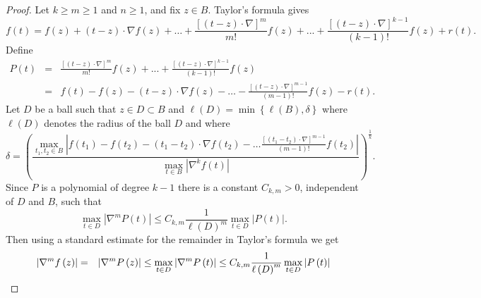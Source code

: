 \documentclass{amsart}
\theoremstyle{plain}
\numberwithin{equation}{section}
\begin{document}
\begin{proof}
Let $k\geq m\geq 1$ and $n\geq 1$, and fix $z\in B$. Taylor's formula gives%
\begin{equation*}
f\left( t\right) =f\left( z\right) +\left( t-z\right) \cdot \nabla f\left(
z\right) +\dots +\frac{\left[ \left( t-z\right) \cdot \nabla \right] ^{m}}{m!%
}f\left( z\right) +...+\frac{\left[ \left( t-z\right) \cdot \nabla \right]
^{k-1}}{\left( k-1\right) !}f\left( z\right) +r\left( t\right) .
\end{equation*}%
Define 
\begin{eqnarray*}
P\left( t\right) &=&\frac{\left[ \left( t-z\right) \cdot \nabla \right] ^{m}%
}{m!}f\left( z\right) +...+\frac{\left[ \left( t-z\right) \cdot \nabla %
\right] ^{k-1}}{\left( k-1\right) !}f\left( z\right) \\
&=&f\left( t\right) -f\left( z\right) -\left( t-z\right) \cdot \nabla
f\left( z\right) -\dots -\frac{\left[ \left( t-z\right) \cdot \nabla \right]
^{m-1}}{(m-1)!}f\left( z\right) -r\left( t\right) .
\end{eqnarray*}%
Let $D$ be a ball such that $z\in D\subset B$ and $\ell \left( D\right)
=\min \left\{ \ell \left( B\right) ,\delta \right\} $ where $\ell \left(
D\right) $ denotes the radius of the ball $D$ and where 
\begin{equation*}
\delta =\left( \frac{\max_{t_{1},t_{2}\in B}\left\vert f\left( t_{1}\right)
-f\left( t_{2}\right) -\left( t_{1}-t_{2}\right) \cdot \nabla f\left(
t_{2}\right) -\dots \frac{\left[ \left( t_{1}-t_{2}\right) \cdot \nabla %
\right] ^{m-1}}{(m-1)!}f\left( t_{2}\right) \right\vert }{\max_{t\in
B}\left\vert \nabla ^{k}f\left( t\right) \right\vert }\right) ^{\frac{1}{k}}.
\end{equation*}%
Since $P$ is a polynomial of degree $k-1$ there is a constant $C_{k,m}>0$,
independent of $D$ and $B$, such that%
\begin{equation*}
\max_{t\in D}\left\vert \nabla ^{m}P\left( t\right) \right\vert \leq C_{k,m}%
\frac{1}{\ell \left( D\right) ^{m}}\max_{t\in D}\left\vert P\left( t\right)
\right\vert .
\end{equation*}%
Then using a standard estimate for the remainder in Taylor's formula we get%
\begin{eqnarray}
\left\vert \nabla ^{m}f\left( z\right) \right\vert &=&\left\vert \nabla
^{m}P\left( z\right) \right\vert \leq \max_{t\in D}\left\vert \nabla
^{m}P\left( t\right) \right\vert \leq C_{k,m}\frac{1}{\ell \left( D\right)
^{m}}\max_{t\in D}\left\vert P\left( t\right) \right\vert  \notag

\end{eqnarray}
\end{proof}
\end{document}
